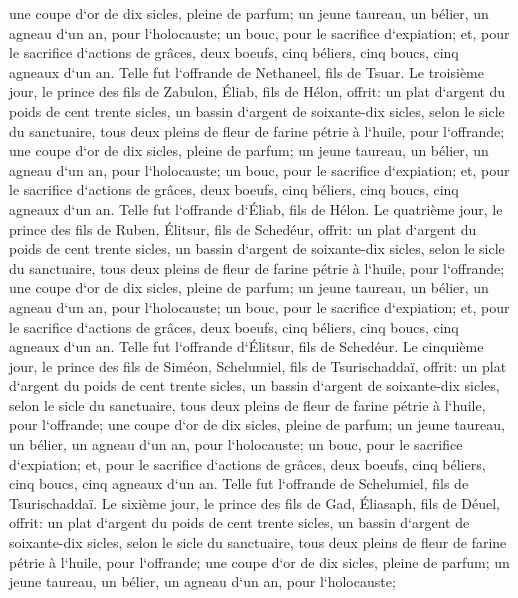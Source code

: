 \verse une coupe d`or de dix sicles, pleine de parfum; 
\verse un jeune taureau, un bélier, un agneau d`un an, pour l`holocauste; 
\verse un bouc, pour le sacrifice d`expiation; 
\verse et, pour le sacrifice d`actions de grâces, deux boeufs, cinq béliers, cinq boucs, cinq agneaux d`un an. Telle fut l`offrande de Nethaneel, fils de Tsuar. 
\verse Le troisième jour, le prince des fils de Zabulon, Éliab, fils de Hélon, 
\verse offrit: un plat d`argent du poids de cent trente sicles, un bassin d`argent de soixante-dix sicles, selon le sicle du sanctuaire, tous deux pleins de fleur de farine pétrie à l`huile, pour l`offrande; 
\verse une coupe d`or de dix sicles, pleine de parfum; 
\verse un jeune taureau, un bélier, un agneau d`un an, pour l`holocauste; 
\verse un bouc, pour le sacrifice d`expiation; 
\verse et, pour le sacrifice d`actions de grâces, deux boeufs, cinq béliers, cinq boucs, cinq agneaux d`un an. Telle fut l`offrande d`Éliab, fils de Hélon. 
\verse Le quatrième jour, le prince des fils de Ruben, Élitsur, fils de Schedéur, 
\verse offrit: un plat d`argent du poids de cent trente sicles, un bassin d`argent de soixante-dix sicles, selon le sicle du sanctuaire, tous deux pleins de fleur de farine pétrie à l`huile, pour l`offrande; 
\verse une coupe d`or de dix sicles, pleine de parfum; 
\verse un jeune taureau, un bélier, un agneau d`un an, pour l`holocauste; 
\verse un bouc, pour le sacrifice d`expiation; 
\verse et, pour le sacrifice d`actions de grâces, deux boeufs, cinq béliers, cinq boucs, cinq agneaux d`un an. Telle fut l`offrande d`Élitsur, fils de Schedéur. 
\verse Le cinquième jour, le prince des fils de Siméon, Schelumiel, fils de Tsurischaddaï, 
\verse offrit: un plat d`argent du poids de cent trente sicles, un bassin d`argent de soixante-dix sicles, selon le sicle du sanctuaire, tous deux pleins de fleur de farine pétrie à l`huile, pour l`offrande; 
\verse une coupe d`or de dix sicles, pleine de parfum; 
\verse un jeune taureau, un bélier, un agneau d`un an, pour l`holocauste; 
\verse un bouc, pour le sacrifice d`expiation; 
\verse et, pour le sacrifice d`actions de grâces, deux boeufs, cinq béliers, cinq boucs, cinq agneaux d`un an. Telle fut l`offrande de Schelumiel, fils de Tsurischaddaï. 
\verse Le sixième jour, le prince des fils de Gad, Éliasaph, fils de Déuel, 
\verse offrit: un plat d`argent du poids de cent trente sicles, un bassin d`argent de soixante-dix sicles, selon le sicle du sanctuaire, tous deux pleins de fleur de farine pétrie à l`huile, pour l`offrande; 
\verse une coupe d`or de dix sicles, pleine de parfum; 
\verse un jeune taureau, un bélier, un agneau d`un an, pour l`holocauste; 
